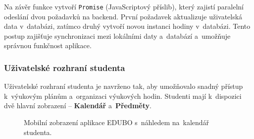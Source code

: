 \documentclass[male,czech,api_bc]{kitheses}
\begin{document}
Na závěr funkce vytvoří \texttt{Promise} (JavaScriptový příslib), který zajistí paralelní odeslání dvou požadavků na backend. První požadavek aktualizuje uživatelská data v~databázi, zatímco druhý vytvoří novou instanci hodiny v~databázi. Tento postup zajišťuje synchronizaci mezi lokálními daty a~databází a~umožňuje správnou funkčnost aplikace.

\subsubsection{Uživatelské rozhraní studenta}

Uživatelské rozhraní studenta je navrženo tak, aby umožňovalo snadný přístup k~výukovým plánům a~organizaci výukových hodin. Studenti mají k~dispozici dvě hlavní zobrazení – \textbf{Kalendář} a~\textbf{Předměty}.

\begin{figure}[H]
	\centering
	\caption{Mobilní zobrazení aplikace EDUBO s~náhledem na~kalendář studenta.}
	\label{fig:edubo-5}
\end{figure}
\end{document}

